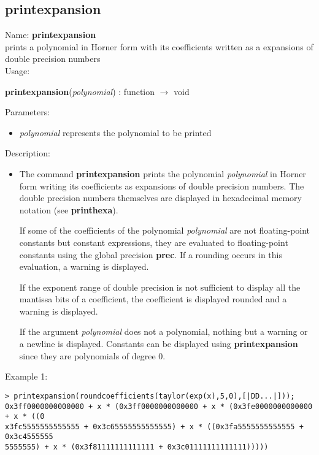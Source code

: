 \subsection{printexpansion}
\label{labprintexpansion}
\noindent Name: \textbf{printexpansion}\\
prints a polynomial in Horner form with its coefficients written as a expansions of double precision numbers\\
\noindent Usage: 
\begin{center}
\textbf{printexpansion}(\emph{polynomial}) : \textsf{function} $\rightarrow$ \textsf{void}\\
\end{center}
Parameters: 
\begin{itemize}
\item \emph{polynomial} represents the polynomial to be printed
\end{itemize}
\noindent Description: \begin{itemize}

\item The command \textbf{printexpansion} prints the polynomial \emph{polynomial} in Horner form
   writing its coefficients as expansions of double precision
   numbers. The double precision numbers themselves are displayed in
   hexadecimal memory notation (see \textbf{printhexa}). 
    
   If some of the coefficients of the polynomial \emph{polynomial} are not
   floating-point constants but constant expressions, they are evaluated
   to floating-point constants using the global precision \textbf{prec}.  If a
   rounding occurs in this evaluation, a warning is displayed.
    
   If the exponent range of double precision is not sufficient to display
   all the mantissa bits of a coefficient, the coefficient is displayed
   rounded and a warning is displayed.
    
   If the argument \emph{polynomial} does not a polynomial, nothing but a
   warning or a newline is displayed. Constants can be displayed using
   \textbf{printexpansion} since they are polynomials of degree $0$.
\end{itemize}
\noindent Example 1: 
\begin{center}\begin{minipage}{15cm}\begin{Verbatim}[frame=single]
> printexpansion(roundcoefficients(taylor(exp(x),5,0),[|DD...|]));
0x3ff0000000000000 + x * (0x3ff0000000000000 + x * (0x3fe0000000000000 + x * ((0
x3fc5555555555555 + 0x3c65555555555555) + x * ((0x3fa5555555555555 + 0x3c4555555
5555555) + x * (0x3f81111111111111 + 0x3c01111111111111)))))
\end{Verbatim}
\end{minipage}\end{center}
